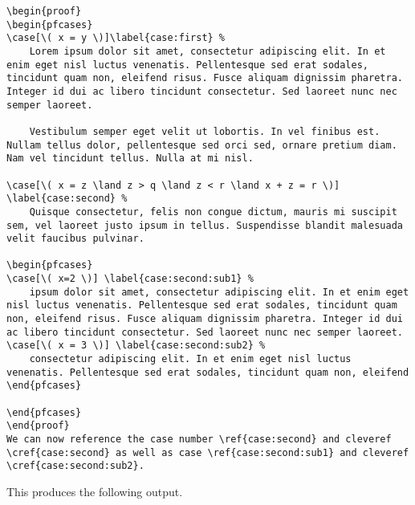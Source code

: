 \documentclass[leqno,11pt]{amsart}
\begin{document}
\begin{verbatim}
\begin{proof}
\begin{pfcases}
\case[\( x = y \)]\label{case:first} %  
	Lorem ipsum dolor sit amet, consectetur adipiscing elit. In et enim eget nisl luctus venenatis. Pellentesque sed erat sodales, tincidunt quam non, eleifend risus. Fusce aliquam dignissim pharetra. Integer id dui ac libero tincidunt consectetur. Sed laoreet nunc nec semper laoreet. 

	Vestibulum semper eget velit ut lobortis. In vel finibus est. Nullam tellus dolor, pellentesque sed orci sed, ornare pretium diam. Nam vel tincidunt tellus. Nulla at mi nisl. 

\case[\( x = z \land z > q \land z < r \land x + z = r \)] \label{case:second} %
	Quisque consectetur, felis non congue dictum, mauris mi suscipit sem, vel laoreet justo ipsum in tellus. Suspendisse blandit malesuada velit faucibus pulvinar. 

\begin{pfcases}
\case[\( x=2 \)] \label{case:second:sub1} % 
	ipsum dolor sit amet, consectetur adipiscing elit. In et enim eget nisl luctus venenatis. Pellentesque sed erat sodales, tincidunt quam non, eleifend risus. Fusce aliquam dignissim pharetra. Integer id dui ac libero tincidunt consectetur. Sed laoreet nunc nec semper laoreet. 
\case[\( x = 3 \)] \label{case:second:sub2} % 
	consectetur adipiscing elit. In et enim eget nisl luctus venenatis. Pellentesque sed erat sodales, tincidunt quam non, eleifend 
\end{pfcases}

\end{pfcases}
\end{proof}
We can now reference the case number \ref{case:second} and cleveref \cref{case:second} as well as case \ref{case:second:sub1} and cleveref \cref{case:second:sub2}.
\end{verbatim}

  This produces the following output.
\end{document}
